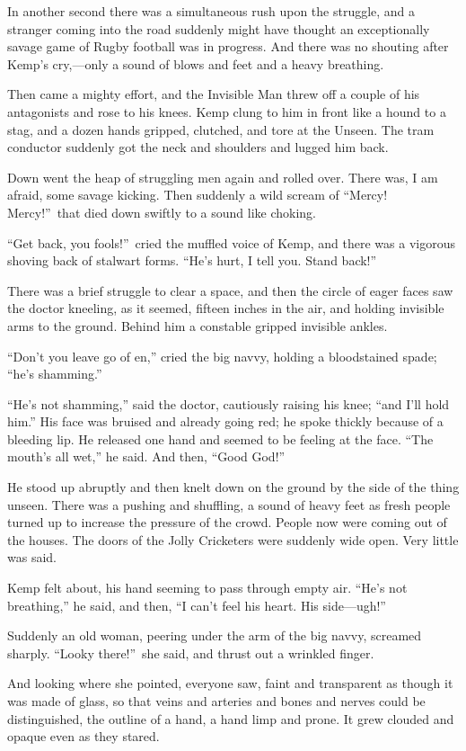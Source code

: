 In another second there was a simultaneous rush upon the struggle, and a stranger coming into the road suddenly might have thought an exceptionally savage game of Rugby football was in progress. And there was no shouting after Kemp’s cry,—only a sound of blows and feet and a heavy breathing.

Then came a mighty effort, and the Invisible Man threw off a couple of his antagonists and rose to his knees. Kemp clung to him in front like a hound to a stag, and a dozen hands gripped, clutched, and tore at the Unseen. The tram conductor suddenly got the neck and shoulders and lugged him back.

Down went the heap of struggling men again and rolled over. There was, I am afraid, some savage kicking. Then suddenly a wild scream of “Mercy! Mercy!”\ that died down swiftly to a sound like choking.

“Get back, you fools!”\ cried the muffled voice of Kemp, and there was a vigorous shoving back of stalwart forms. “He’s hurt, I tell you. Stand back!”

There was a brief struggle to clear a space, and then the circle of eager faces saw the doctor kneeling, as it seemed, fifteen inches in the air, and holding invisible arms to the ground. Behind him a constable gripped invisible ankles.

“Don’t you leave go of en,” cried the big navvy, holding a bloodstained spade; “he’s shamming.”

“He’s not shamming,” said the doctor, cautiously raising his knee; “and I’ll hold him.” His face was bruised and already going red; he spoke thickly because of a bleeding lip. He released one hand and seemed to be feeling at the face. “The mouth’s all wet,” he said. And then, “Good God!”

He stood up abruptly and then knelt down on the ground by the side of the thing unseen. There was a pushing and shuffling, a sound of heavy feet as fresh people turned up to increase the pressure of the crowd. People now were coming out of the houses. The doors of the Jolly Cricketers were suddenly wide open. Very little was said.

Kemp felt about, his hand seeming to pass through empty air. “He’s not breathing,” he said, and then, “I can’t feel his heart. His side—ugh!”

Suddenly an old woman, peering under the arm of the big navvy, screamed sharply. “Looky there!”\ she said, and thrust out a wrinkled finger.

And looking where she pointed, everyone saw, faint and transparent as though it was made of glass, so that veins and arteries and bones and nerves could be distinguished, the outline of a hand, a hand limp and prone. It grew clouded and opaque even as they stared.

